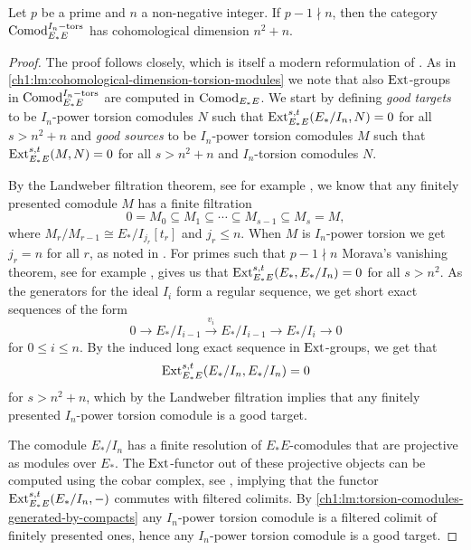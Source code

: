 \begin{lemma}
    \label{ch1:lm:cohomological-dimension-torsion-comodules}
    Let $p$ be a prime and $n$ a non-negative integer. If $p-1\nmid n$, then the category $\mathrm{Comod}_{E_*E}^{I_n-\mathrm{tors}}$ has cohomological dimension $n^2+n$. 
\end{lemma}
\begin{proof}
    The proof follows \cite[2.5]{pstragowski_2021} closely, which is itself a modern reformulation of \cite[3.4.3.9]{franke_96}. As in \cref{ch1:lm:cohomological-dimension-torsion-modules} we note that also $\operatorname{Ext}$-groups in $\mathrm{Comod}_{E_*E}^{I_n-\mathrm{tors}}$ are computed in $\mathrm{Comod}_{E_*E}$. We start by defining \emph{good targets} to be $I_n$-power torsion comodules $N$ such that $\operatorname{Ext}_{E_*E}^{s,t}(E_*/I_n, N)=0$ for all $s>n^2+n$ and \emph{good sources} to be $I_n$-power torsion comodules $M$ such that $\operatorname{Ext}_{E_*E}^{s,t}(M,N)=0$ for all $s>n^2+n$ and $I_n$-torsion comodules $N$. 

    By the Landweber filtration theorem, see for example \cite[5.7]{hovey-strickland_2005a}, we know that any finitely presented comodule $M$ has a finite filtration 
    \[0=M_0 \subseteq M_1 \subseteq \cdots \subseteq M_{s-1}\subseteq M_s=M,\]
    where $M_r/M_{r-1} \cong E_*/I_{j_r}[t_r]$ and $j_r\leq n$. When $M$ is $I_n$-power torsion we get $j_r=n$ for all $r$, as noted in \cite[4.3]{hovey-strickland_2005a}. For primes such that $p-1\nmid n$ Morava's vanishing theorem, see for example \cite[6.2.10]{ravenel_86}, gives us that $\operatorname{Ext}_{E_*E}^{s,t}(E_*, E_*/I_n) = 0$ for all $s>n^2$. As the generators for the ideal $I_i$ form a regular sequence, we get short exact sequences of the form 
    \[0\longrightarrow E_*/I_{i-1} \overset{v_i}\longrightarrow E_*/I_{i-1} \longrightarrow E_*/I_i\longrightarrow 0\]
    for $0\leq i\leq n$. By the induced long exact sequence in $\operatorname{Ext}$-groups, we get that 
    \[\operatorname{Ext}_{E_*E}^{s,t}(E_*/I_n, E_*/I_n) = 0\] 
    for $s>n^2+n$, which by the Landweber filtration implies that any finitely presented $I_n$-power torsion comodule is a good target.
    
    The comodule $E_*/I_n$ has a finite resolution of $E_*E$-comodules that are projective as modules over $E_*$. The $\operatorname{Ext}$-functor out of these projective objects can be computed using the cobar complex, see \cite[A1.2.12]{ravenel_86}, implying that the functor $\operatorname{Ext}_{E_*E}^{s,t}(E_*/I_n, -)$ commutes with filtered colimits. By \cref{ch1:lm:torsion-comodules-generated-by-compacts} any $I_n$-power torsion comodule is a filtered colimit of finitely presented ones, hence any $I_n$-power torsion comodule is a good target. 


\end{proof}
